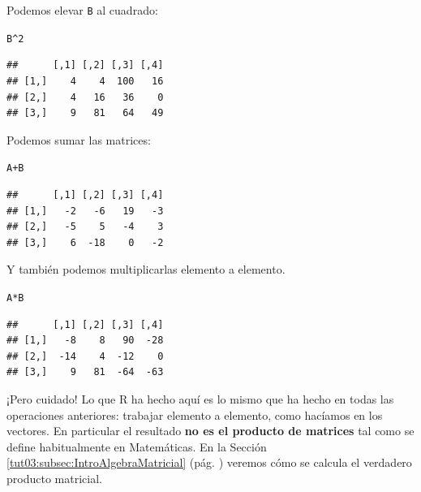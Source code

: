 \documentclass[10pt,a4paper]{article}\usepackage[]{graphicx}\usepackage[]{color}
\makeatletter
\newcommand{\hlnum}[1]{\textcolor[rgb]{0.686,0.059,0.569}{#1}}%
\newcommand{\hlopt}[1]{\textcolor[rgb]{0,0,0}{#1}}%
\newcommand{\hlstd}[1]{\textcolor[rgb]{0.345,0.345,0.345}{#1}}%
\newenvironment{kframe}{%
 \def\at@end@of@kframe{}%
 \ifinner\ifhmode%
  \def\at@end@of@kframe{\end{minipage}}%
  \begin{minipage}{\columnwidth}%
 \fi\fi%
 \def\FrameCommand##1{\hskip\@totalleftmargin \hskip-\fboxsep
 \colorbox{shadecolor}{##1}\hskip-\fboxsep
     \hskip-\linewidth \hskip-\@totalleftmargin \hskip\columnwidth}%
 \MakeFramed {\advance\hsize-\width
   \@totalleftmargin\z@ \linewidth\hsize
   \@setminipage}}%
 {\par\unskip\endMakeFramed%
 \at@end@of@kframe}
\newenvironment{knitrout}{}{} %
\makeatother
\begin{document}
Podemos elevar {\tt B} al cuadrado:
\begin{knitrout}
\color{fgcolor}\begin{kframe}
\begin{alltt}
    \hlstd{B}\hlopt{^}\hlnum{2}
\end{alltt}
\begin{verbatim}
##      [,1] [,2] [,3] [,4]
## [1,]    4    4  100   16
## [2,]    4   16   36    0
## [3,]    9   81   64   49
\end{verbatim}
\end{kframe}
\end{knitrout}
Podemos sumar las matrices:
\begin{knitrout}
\color{fgcolor}\begin{kframe}
\begin{alltt}
    \hlstd{A} \hlopt{+} \hlstd{B}
\end{alltt}
\begin{verbatim}
##      [,1] [,2] [,3] [,4]
## [1,]   -2   -6   19   -3
## [2,]   -5    5   -4    3
## [3,]    6  -18    0   -2
\end{verbatim}
\end{kframe}
\end{knitrout}
Y también podemos multiplicarlas elemento a elemento.
\begin{knitrout}
\color{fgcolor}\begin{kframe}
\begin{alltt}
    \hlstd{A} \hlopt{*} \hlstd{B}
\end{alltt}
\begin{verbatim}
##      [,1] [,2] [,3] [,4]
## [1,]   -8    8   90  -28
## [2,]  -14    4  -12    0
## [3,]    9   81  -64  -63
\end{verbatim}
\end{kframe}
\end{knitrout}
¡Pero cuidado! Lo que R ha hecho aquí es lo mismo que ha hecho en todas las operaciones anteriores: trabajar elemento a elemento, como hacíamos en los vectores. En particular el resultado {\bf no es el producto de matrices} tal como se define habitualmente en Matemáticas. En la Sección \ref{tut03:subsec:IntroAlgebraMatricial} (pág. \pageref{tut03:subsec:IntroAlgebraMatricial}) veremos cómo se calcula el verdadero producto matricial.
\end{document}
